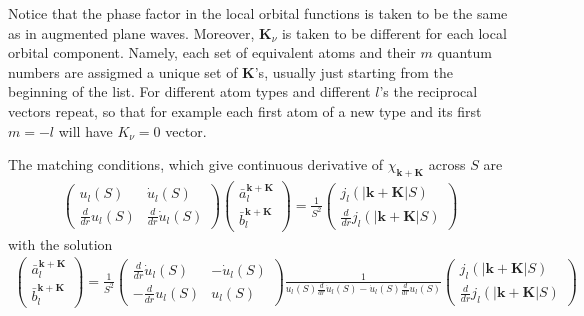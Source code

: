 \documentclass[aps,prb,floatfix,epsfig,singlecolumn,showpacs,preprintnumbers]{revtex4}
\renewcommand{\vr}{{\mathbf{r}}}
\newcommand{\vk}{{\mathbf{k}}}
\newcommand{\vK}{{\mathbf{K}}}
\begin{document}
Notice that the phase factor in the local orbital functions is taken
to be the same as in augmented plane waves. Moreover, $\vK_\nu$ is
taken to be different for each local orbital component. Namely, each
set of equivalent atoms and their $m$ quantum numbers are assigmed a unique set
of $\vK$'s, usually just starting from the beginning of the
list. For different atom types and different $l$'s the reciprocal
vectors repeat, so that for example each first atom of a new type and
its first $m=-l$ will have $K_\nu=0$ vector. 





The matching conditions, which give continuous derivative of $\chi_{\vk+\vK}$
across $S$ are
\begin{eqnarray}
\left(
\begin{array}{cc}
u_l(S) & \dot{u}_l(S)\\
\frac{d}{dr} u_l(S) & \frac{d}{dr} \dot{u}_l(S)
\end{array}
\right)
\left(
\begin{array}{c}
\bar{a}^{\vk+\vK}_{l}\\
\bar{b}^{\vk+\vK}_{l}
\end{array}
\right)=
\frac{1}{S^2}
\left(
\begin{array}{c}
j_l(|\vk+\vK|S)\\
\frac{d}{dr} j_l(|\vk+\vK|S)
\end{array}
\right)
\end{eqnarray}
with the solution
\begin{eqnarray}
\left(
\begin{array}{c}
\bar{a}^{\vk+\vK}_{l}\\
\bar{b}^{\vk+\vK}_{l}
\end{array}
\right)=
\frac{1}{S^2}
\left(
\begin{array}{cc}
\frac{d}{dr} \dot{u}_l(S)  & -\dot{u}_l(S)\\
-\frac{d}{dr} u_l(S) & u_l(S)       
\end{array}
\right)
\frac{1}{u_l(S) \frac{d}{dr} \dot{u}_l(S)-\dot{u}_l(S) \frac{d}{dr} u_l(S)}
%
\left(
\begin{array}{c}
j_l(|\vk+\vK|S)\\
\frac{d}{dr} j_l(|\vk+\vK|S)
\end{array}
\right)
\end{eqnarray}
\end{document}
